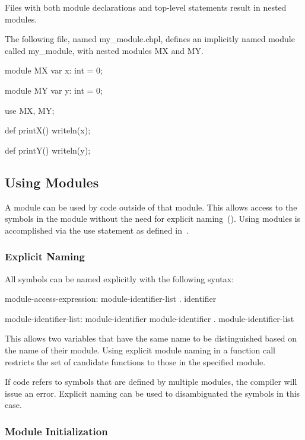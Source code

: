 Files with both module declarations and top-level statements result in
nested modules.

\begin{example}
The following file, named my\_module.chpl, defines an
implicitly named module called my\_module, with nested modules
MX and MY.
\begin{chapelcode}
module MX {
  var x: int = 0;
}

module MY {
  var y: int = 0;
}

use MX, MY;

def printX() {
  writeln(x);
}

def printY() {
  writeln(y);
}
\end{chapelcode}
\end{example}


\subsection{Using Modules}
\label{Using_Modules}

A module can be used by code outside of that module.  This allows
access to the symbols in the module without the need for explicit
naming~().  Using modules is accomplished via
the use statement as defined in~.

\subsubsection{Explicit Naming}
\label{Explicit_Naming}

All symbols can be named explicitly with the following syntax:
\begin{syntax}
module-access-expression:
  module-identifier-list . identifier

module-identifier-list:
  module-identifier
  module-identifier . module-identifier-list

\end{syntax}
This allows two variables that have the same name to be distinguished
based on the name of their module.  Using explicit module naming in a
function call restricts the set of candidate functions to those in the
specified module.

If code refers to symbols that are defined by multiple modules, the
compiler will issue an error.  Explicit naming can be used to
disambiguated the symbols in this case.



\subsubsection{Module Initialization}
\label{Module_Initialization}


